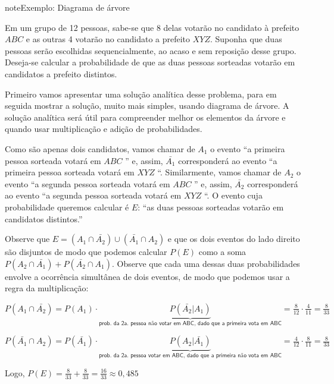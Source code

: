 \begin{sphinxadmonition}{note}{Exemplo: Diagrama de árvore}

Em um grupo de 12 pessoas, sabe-se que 8 delas votarão no candidato à prefeito  \(ABC\) e as outras 4 votarão no candidato a prefeito \(XYZ\). Suponha que duas pessoas serão escolhidas sequencialmente, ao acaso e sem reposição desse grupo. Deseja-se calcular a probabilidade de que as duas pessoas sorteadas votarão em candidatos a prefeito distintos.

Primeiro vamos apresentar uma solução analítica desse problema, para em seguida mostrar a solução, muito mais simples, usando diagrama de árvore. A solução analítica será útil para compreender melhor os elementos da árvore e quando usar multiplicação e adição de probabilidades.

Como são apenas dois candidatos, vamos chamar de \(A_1\) o evento “a primeira pessoa sorteada votará em \(ABC\) ” e, assim, \(\bar{A_1}\) corresponderá ao evento “a primeira pessoa sorteada votará em \(XYZ\) “. Similarmente, vamos chamar de \(A_2\) o evento “a segunda pessoa sorteada votará em \(ABC\) ” e, assim, \(\bar{A_2}\) corresponderá ao evento “a segunda pessoa sorteada votará em \(XYZ\) “. O evento cuja probabilidade queremos calcular é \(E\): “as duas pessoas sorteadas votarão em candidatos distintos.”

Observe que \(E=(A_1\cap \bar{A_2})\cup (\bar{A_1}\cap A_2)\)  e que os dois eventos do lado direito são disjuntos de modo que podemos calcular \(P(E)\) como a soma \(P(A_2\cap \bar{A_1})+P(\bar{A_2}\cap A_1)\). Observe que cada uma dessas duas probabilidades envolve a ocorrência simultânea de dois eventos, de modo que podemos usar a regra da multiplicação:

\(P(A_1\cap \bar{A_2})=P({A_1})\cdot \underbrace{P(\bar{A_2}|{A_1})}_{\textsf{prob. da 2a. pessoa não votar em ABC, dado que a primeira vota em ABC}}=\frac{8}{12}\cdot\frac{4}{11}=\frac{8}{33}\)

\(P(\bar{A_1}\cap {A_2})=P(\bar{A_1})\cdot \underbrace{P({A_2}|\bar{A_1})}_{\textsf{prob. da 2a. pessoa votar em ABC, dado que a primeira não vota em ABC}}=\frac{4}{12}\cdot\frac{8}{11}=\frac{8}{33}\)

Logo, \(P(E)=\frac{8}{33}+\frac{8}{33}=\frac{16}{33}\approx 0,485\)


\end{sphinxadmonition}
